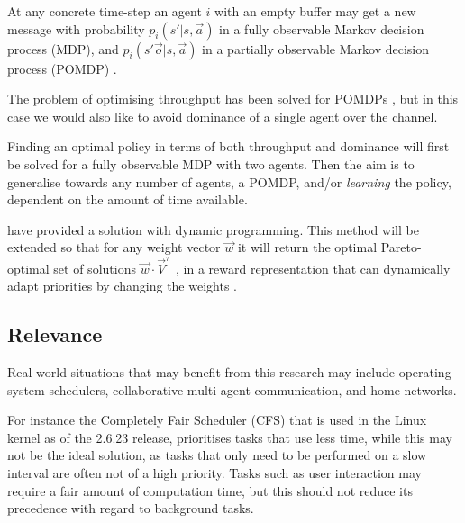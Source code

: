 \documentclass{article}
\begin{document}
\begin{multicols}{2}
	At any concrete time-step an agent $i$ with an empty buffer may get a new
	message with probability $p_i(s' |s, \vec{a})$ in a fully observable Markov
	decision process (MDP), and $p_i(s' \vec{o}|s, \vec{a})$ in a partially
	observable Markov decision process (POMDP) \citep{hansen2004dynamic}.

	The problem of optimising throughput has been solved for POMDPs
	\citep{ooi1996decentralized, hansen2004dynamic}, but in this case we would
	also like to avoid dominance of a single agent over the channel.

	Finding an optimal policy in terms of both throughput and dominance will
	first be solved for a fully observable MDP with two agents. Then the aim is
	to generalise towards any number of agents, a POMDP, and/or \emph{learning}
	the policy, dependent on the amount of time available.

	\citet{hansen2004dynamic} have provided a solution with dynamic programming.
	This method will be extended so that for any weight vector $\vec{w}$ it will
	return the optimal Pareto-optimal set of solutions $\vec{w} \cdot
	\vec{V}^\pi$ \citep{vamplew2011empirical}, in a reward representation that
	can dynamically adapt priorities by changing the weights
	\citep{barrett2008learning,natarajan2005dynamic}.



	\subsection{Relevance}
	\label{sub:relevance}
	Real-world situations that may benefit from this research may include
	operating system schedulers, collaborative multi-agent communication, and
	home networks.

	For instance the Completely Fair Scheduler (CFS) that is used in the Linux
	kernel as of the 2.6.23 release, prioritises tasks that use less time, while
	this may not be the ideal solution, as tasks that only need to be performed
	on a slow interval are often not of a high priority. Tasks such as user
	interaction may require a fair amount of computation time, but this should
	not reduce its precedence with regard to background tasks.


\end{multicols}
\end{document}
